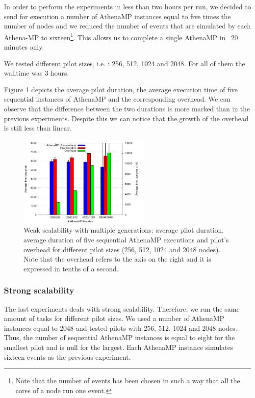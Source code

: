 In order to perform the experiments in less than two hours per run, we decided to send for execution a number of AthenaMP instances equal to five times the number of nodes and we reduced  the number of events that are simulated by each Athena-MP to sixteen\footnote{Note that the number of events has been chosen in such a way that all the cores of a node run one event.}. This allows us to complete a single AthenaMP in ~20 minutes only. 

We tested different pilot sizes, i.e. : 256, 512, 1024 and 2048. For all of them the walltime was 3 hours. 

Figure \ref{fig:weakScal2a} depicts the average pilot duration, the average execution time of five sequential instances of AthenaMP and the corresponding overhead.  
We can observe that the difference between the two durations is more marked than in the previous experiments. Despite this we can notice that the growth of the overhead is still less than linear.

\begin{figure}[!htb]
        \includegraphics[height=4.5cm,width=\columnwidth]{./figures/NGE/weak2.pdf}
    \caption{Weak scalability with multiple generations: average pilot duration, average duration of five sequential AthenaMP executions and pilot's overhead for different pilot sizes (256, 512, 1024 and 2048 nodes). Note that the overhead refers to the axis on the right and it is expressed in tenths of a second.}
\label{fig:weakScal2a}
\end{figure}
\subsubsection{Strong scalability}
The last experiments deals with strong scalability. Therefore, we run the same amount of tasks for different pilot sizes. 
We used a number of AthenaMP instances equal to 2048 and tested pilots with 256, 512, 1024 and 2048 nodes. Thus, the number of sequential AthenaMP instances is equal to eight for the smallest pilot and is null for the largest.  
Each AthenaMP instance simulates sixteen events as the previous experiment.


